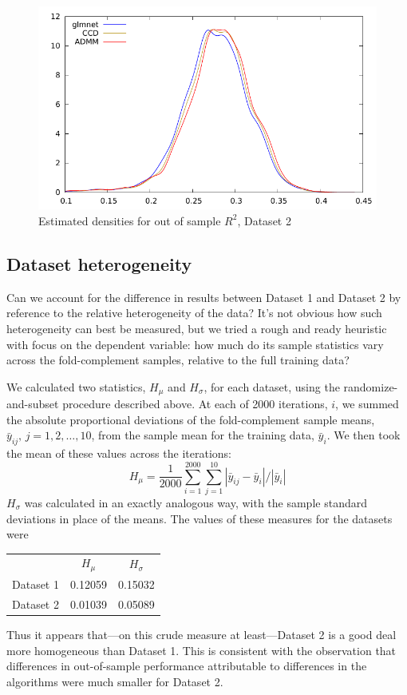 \documentclass{article}
\begin{document}
\begin{figure}[htbp]
  \centering
  \includegraphics[scale=0.9]{wine_kd3.pdf} 
  \caption{Estimated densities for out of sample $R^2$, Dataset 2}
  \label{fig:dset2}
\end{figure}

\subsection*{Dataset heterogeneity}

Can we account for the difference in results between Dataset 1 and
Dataset 2 by reference to the relative heterogeneity of the data?
It's not obvious how such heterogeneity can best be measured, but we
tried a rough and ready heuristic with focus on the dependent
variable: how much do its sample statistics vary across the
fold-complement samples, relative to the full training data?

We calculated two statistics, $H_\mu$ and $H_\sigma$, for each
dataset, using the randomize-and-subset procedure described above.  At
each of 2000 iterations, $i$, we summed the absolute proportional
deviations of the fold-complement sample means,
$\bar{y}_{ij},\, j=1,2,\dots,10$, from the sample mean for the
training data, $\bar{y}_i$. We then took the mean of these values
across the iterations:
\[
  H_\mu = \frac{1}{2000} \sum_{i=1}^{2000} \sum_{j=1}^{10} |\bar{y}_{ij} - \bar{y}_i|/|\bar{y}_i|
\]
$H_\sigma$ was calculated in an exactly analogous way, with the sample
standard deviations in place of the means.  The values of these
measures for the datasets were
\begin{center}
  \begin{tabular}{lcc}
    & $H_\mu$ & $H_\sigma$ \\
    Dataset 1 & 0.12059 & 0.15032 \\
    Dataset 2 & 0.01039 & 0.05089
  \end{tabular}
\end{center}
Thus it appears that---on this crude measure at least---Dataset 2 is a
good deal more homogeneous than Dataset 1. This is consistent with the
observation that differences in out-of-sample performance attributable
to differences in the algorithms were much smaller for Dataset 2.
\end{document}

